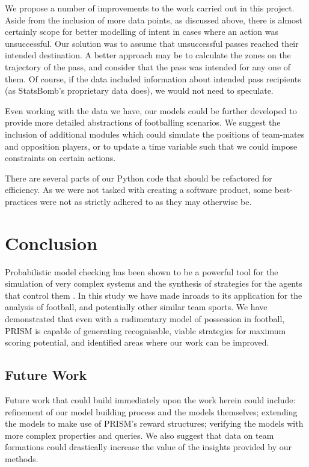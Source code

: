 \documentclass{l4proj}
\begin{document}
We propose a number of improvements to the work carried out in this project. Aside from the inclusion of more data points, as discussed above, there is almost certainly scope for better modelling of intent in cases where an action was unsuccessful. Our solution was to assume that unsuccessful passes reached their intended destination. A better approach may be to calculate the zones on the trajectory of the pass, and consider that the pass was intended for any one of them. Of course, if the data included information about intended pass recipients (as StatsBomb's proprietary data does), we would not need to speculate.

Even working with the data we have, our models could be further developed to provide more detailed abstractions of footballing scenarios. We suggest the inclusion of additional modules which could simulate the positions of team-mates and opposition players, or to update a time variable such that we could impose constraints on certain actions.

There are several parts of our Python code that should be refactored for efficiency. As we were not tasked with creating a software product, some best-practices were not as strictly adhered to as they may otherwise be.

\chapter{Conclusion}    

Probabilistic model checking has been shown to be a powerful tool for the simulation of very complex systems and the synthesis of strategies for the agents that control them \cite{fac2}. In this study we have made inroads to its application for the analysis of football, and potentially other similar team sports. We have demonstrated that even with a rudimentary model of possession in football, PRISM is capable of generating recognisable, viable strategies for maximum scoring potential, and identified areas where our work can be improved.

\section{Future Work}

Future work that could build immediately upon the work herein could include: refinement of our model building process and the models themselves; extending the models to make use of PRISM's reward structures; verifying the models with more complex properties and queries. We also suggest that data on team formations could drastically increase the value of the insights provided by our methods. 
\end{document}
